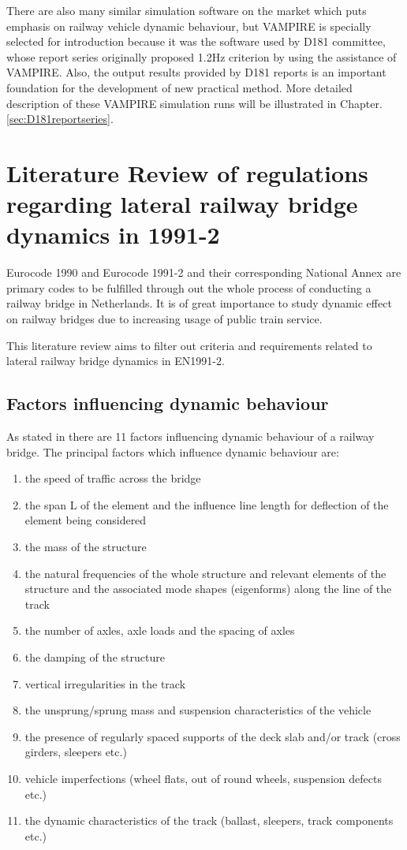 There are also many similar simulation software on the market which puts emphasis on railway vehicle dynamic behaviour, but VAMPIRE is specially selected for introduction because it was the software used by D181 committee, whose report series originally proposed 1.2Hz criterion by using the assistance of VAMPIRE. Also, the output results provided by D181 reports is an important foundation for the development of new practical method. More detailed description of these VAMPIRE simulation runs will be illustrated in Chapter.\ref{sec:D181reportseries}.

\chapter{Literature Review of regulations regarding lateral railway bridge dynamics in 1991-2} 
Eurocode 1990 and Eurocode 1991-2 and their corresponding National Annex are primary codes to be fulfilled through out the whole process of conducting a railway bridge in Netherlands. It is of great importance to study dynamic effect on railway bridges due to increasing usage of public train service.

This literature review aims to filter out criteria and requirements related to lateral railway bridge dynamics in EN1991-2.


\section{Factors influencing dynamic behaviour}
As stated in\citet[6.4.2]{EC12} there are 11 factors influencing dynamic behaviour of a railway bridge. The principal factors which influence dynamic behaviour are:
\begin{enumerate}[-]
	\item the speed of traffic across the bridge
	\item the span L of the element and the influence line length for deflection of the element being considered
	\item the mass of the structure
	\item the natural frequencies of the whole structure and relevant elements of the structure and the associated mode shapes (eigenforms) along the line of the track
	\item the number of axles, axle loads and the spacing of axles
	\item the damping of the structure
	\item vertical irregularities in the track
	\item the unsprung/sprung mass and suspension characteristics of the vehicle
	\item the presence of regularly spaced supports of the deck slab and/or track (cross girders, sleepers etc.)
	\item vehicle imperfections (wheel flats, out of round wheels, suspension defects etc.)
	\item the dynamic characteristics of the track (ballast, sleepers, track components etc.)
\end{enumerate}

